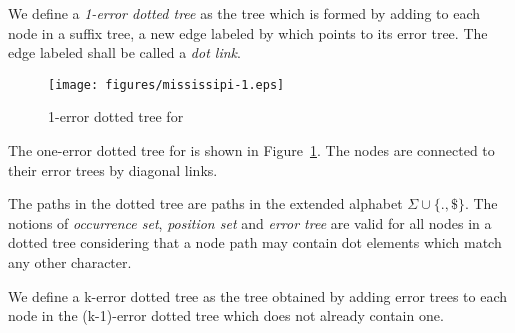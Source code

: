 \begin{definition}
We define a \emph{1-error dotted tree} as the tree which is formed by adding to each node in a suffix tree, a new edge labeled by  which points to its error tree. The edge labeled  shall be called a \emph{dot link}.
\end{definition}

\begin{figure} 
\texttt{[image: figures/mississipi-1.eps]}
\caption{1-error dotted tree for }%
\label{fig:mississipi-1}
\end{figure}


The one-error dotted tree for  is shown in Figure~\ref{fig:mississipi-1}. The nodes are connected to their error trees by diagonal links.

The paths in the dotted tree are paths in the extended alphabet $\Sigma\cup\{.,\$\}$. The notions of \emph{occurrence set}, \emph{position set} and \emph{error tree} are valid for all nodes in a dotted tree considering that a node path may contain dot elements which match any other character.

\begin{definition}
We define a k-error dotted tree as the tree obtained by adding error trees to each node in the (k-1)-error dotted tree which does not already contain one.
\end{definition}

